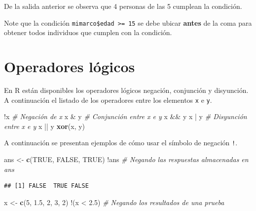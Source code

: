 \documentclass[10pt,]{krantz}
\makeatletter
\newenvironment{Shaded}{\begin{snugshade}}{\end{snugshade}}
\newcommand{\KeywordTok}[1]{\textcolor[rgb]{0.13,0.29,0.53}{\textbf{{#1}}}}
\newcommand{\DecValTok}[1]{\textcolor[rgb]{0.00,0.00,0.81}{{#1}}}
\newcommand{\FloatTok}[1]{\textcolor[rgb]{0.00,0.00,0.81}{{#1}}}
\newcommand{\StringTok}[1]{\textcolor[rgb]{0.31,0.60,0.02}{{#1}}}
\newcommand{\CommentTok}[1]{\textcolor[rgb]{0.56,0.35,0.01}{\textit{{#1}}}}
\newcommand{\OtherTok}[1]{\textcolor[rgb]{0.56,0.35,0.01}{{#1}}}
\newcommand{\NormalTok}[1]{{#1}}
\let\proglang=\textsf
\newenvironment{kframe}{%
\medskip{}
\setlength{\fboxsep}{.8em}
 \def\at@end@of@kframe{}%
 \ifinner\ifhmode%
  \def\at@end@of@kframe{\end{minipage}}%
  \begin{minipage}{\columnwidth}%
 \fi\fi%
 \def\FrameCommand##1{\hskip\@totalleftmargin \hskip-\fboxsep
 \colorbox{shadecolor}{##1}\hskip-\fboxsep
     \hskip-\linewidth \hskip-\@totalleftmargin \hskip\columnwidth}%
 \MakeFramed {\advance\hsize-\width
   \@totalleftmargin\z@ \linewidth\hsize
   \@setminipage}}%
 {\par\unskip\endMakeFramed%
 \at@end@of@kframe}
\renewenvironment{Shaded}{\begin{kframe}}{\end{kframe}}
\let\BeginKnitrBlock\begin \let\EndKnitrBlock\end
\makeatother
\begin{document}
De la salida anterior se observa que 4 personas de las 5 cumplean la
condición.

\BeginKnitrBlock{rmdwarning}
Note que la condición \texttt{mimarco\$edad\ \textgreater{}=\ 15} se
debe ubicar \textbf{antes} de la coma para obtener todos individuos que
cumplen con la condición.
\EndKnitrBlock{rmdwarning}

\section{\texorpdfstring{Operadores lógicos
}{Operadores lógicos }}\label{operadores-logicos}

En \proglang{R} están disponibles los operadores lógicos negación,
conjunción y disyunción. A continuación el listado de los operadores
entre los elementos \texttt{x} e \texttt{y}.

\begin{Shaded}
\begin{Highlighting}[]
\NormalTok{!x  }\CommentTok{# Negación de x}
\NormalTok{x &}\StringTok{ }\NormalTok{y  }\CommentTok{# Conjunción entre x e y}
\NormalTok{x &&}\StringTok{ }\NormalTok{y}
\NormalTok{x |}\StringTok{ }\NormalTok{y  }\CommentTok{# Disyunción entre x e y}
\NormalTok{x ||}\StringTok{ }\NormalTok{y}
\KeywordTok{xor}\NormalTok{(x, y)}
\end{Highlighting}
\end{Shaded}

A continuación se presentan ejemplos de cómo usar el símbolo de negación
\texttt{!}.

\begin{Shaded}
\begin{Highlighting}[]
\NormalTok{ans <-}\StringTok{ }\KeywordTok{c}\NormalTok{(}\OtherTok{TRUE}\NormalTok{, }\OtherTok{FALSE}\NormalTok{, }\OtherTok{TRUE}\NormalTok{)}
\NormalTok{!ans  }\CommentTok{# Negando las respuestas almacenadas en ans}
\end{Highlighting}
\end{Shaded}

\begin{verbatim}
## [1] FALSE  TRUE FALSE
\end{verbatim}

\begin{Shaded}
\begin{Highlighting}[]
\NormalTok{x <-}\StringTok{ }\KeywordTok{c}\NormalTok{(}\DecValTok{5}\NormalTok{, }\FloatTok{1.5}\NormalTok{, }\DecValTok{2}\NormalTok{, }\DecValTok{3}\NormalTok{, }\DecValTok{2}\NormalTok{)}
\NormalTok{!(x <}\StringTok{ }\FloatTok{2.5}\NormalTok{)  }\CommentTok{# Negando los resultados de una prueba}
\end{Highlighting}
\end{Shaded}
\end{document}

